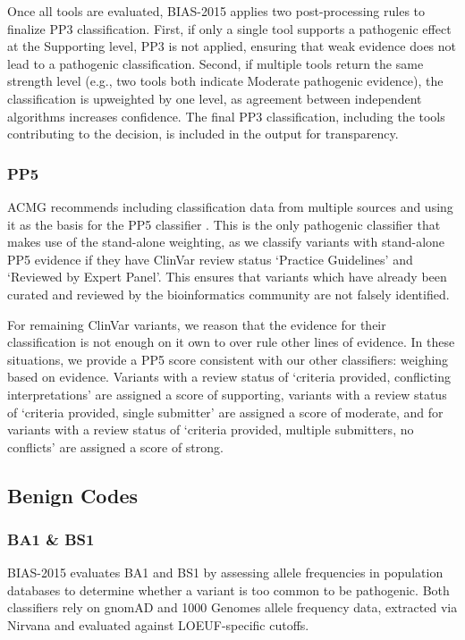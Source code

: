 \documentclass[unnumsec,webpdf,contemporary,large]{oup-authoring-template}
\theoremstyle{thmstyleone}
\theoremstyle{thmstyletwo}
\theoremstyle{thmstylethree}
\begin{document}
Once all tools are evaluated, BIAS-2015 applies two post-processing rules to finalize PP3 classification. First, if only a single tool supports a pathogenic effect at the Supporting level, PP3 is not applied, ensuring that weak evidence does not lead to a pathogenic classification. Second, if multiple tools return the same strength level (e.g., two tools both indicate Moderate pathogenic evidence), the classification is upweighted by one level, as agreement between independent algorithms increases confidence. The final PP3 classification, including the tools contributing to the decision, is included in the output for transparency.

\subsubsection{PP5}
ACMG recommends including classification data from multiple sources and using it as the basis for the PP5 classifier \cite{biesecker2018reputable}. This is the only pathogenic classifier that makes use of the stand-alone weighting, as we classify variants with stand-alone PP5 evidence if they have ClinVar review status ‘Practice Guidelines’ and ‘Reviewed by Expert Panel’. This ensures that variants which have already been curated and reviewed by the bioinformatics community are not falsely identified.  

For remaining ClinVar variants, we reason that the evidence for their classification is not enough on it own to over rule other lines of evidence. In these situations, we provide a PP5 score consistent with our other classifiers: weighing based on evidence. Variants with a review status of ‘criteria provided, conflicting interpretations’ are assigned a score of supporting, variants with a review status of ‘criteria provided, single submitter’ are assigned a score of moderate, and for variants with a review status of ‘criteria provided, multiple submitters, no conflicts’ are assigned a score of strong.

\subsection{Benign Codes}
\subsubsection{BA1 \& BS1}
BIAS-2015 evaluates BA1 and BS1 by assessing allele frequencies in population databases to determine whether a variant is too common to be pathogenic. Both classifiers rely on gnomAD and 1000 Genomes allele frequency data, extracted via Nirvana and evaluated against LOEUF-specific cutoffs.
\end{document}
